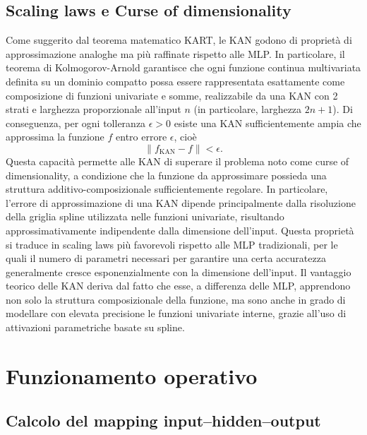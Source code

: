 \documentclass[a4paper,12pt]{report}
\begin{document}
	\subsection{Scaling laws e Curse of dimensionality}
	Come suggerito dal teorema matematico KART, le KAN godono di proprietà di approssimazione analoghe ma più raffinate rispetto alle MLP. In particolare, il teorema di Kolmogorov-Arnold garantisce che ogni funzione continua multivariata definita su un dominio compatto possa essere rappresentata esattamente come composizione di funzioni univariate e somme, realizzabile da una KAN con 2 strati e larghezza proporzionale all'input $n$ (in particolare, larghezza $2n + 1$).
	Di conseguenza, per ogni tolleranza $\epsilon > 0$ esiste una KAN sufficientemente ampia che approssima la funzione $f$ entro errore $\epsilon$, cioè
	\begin{equation*}
		\| f_{\mathrm{KAN}} - f \| < \epsilon.
	\end{equation*}
	Questa capacità permette alle KAN di superare il problema noto come curse of dimensionality, a condizione che la funzione da approssimare possieda una struttura additivo-composizionale sufficientemente regolare. In particolare, l'errore di approssimazione di una KAN dipende principalmente dalla risoluzione della griglia spline utilizzata nelle funzioni univariate, risultando approssimativamente indipendente dalla dimensione dell'input. Questa proprietà si traduce in scaling laws più favorevoli rispetto alle MLP tradizionali, per le quali il numero di parametri necessari per garantire una certa accuratezza generalmente cresce esponenzialmente con la dimensione dell'input. Il vantaggio teorico delle KAN deriva dal fatto che esse, a differenza delle MLP, apprendono non solo la struttura composizionale della funzione, ma sono anche in grado di modellare con elevata precisione le funzioni univariate interne, grazie all’uso di attivazioni parametriche basate su spline.
	
	\section{Funzionamento operativo}
	
	\subsection{Calcolo del mapping input–hidden–output}
	
\end{document}
